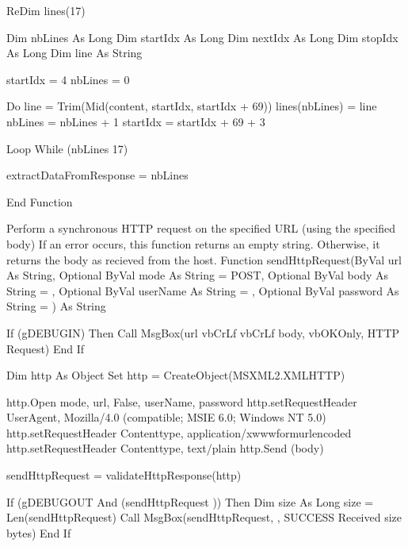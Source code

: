 \documentclass[letterpaper,10pt,english]{sphinxmanual}
\begin{document}
\begin{sphinxVerbatim}[commandchars=\\\{\}]
   ReDim lines(17)

   Dim nbLines As Long
   Dim startIdx As Long
   Dim nextIdx As Long
   Dim stopIdx As Long
   Dim line As String

   startIdx = 4
   nbLines = 0

   Do
      line = Trim(Mid(content, startIdx, startIdx + 69))
      lines(nbLines) = line
      nbLines = nbLines + 1
      startIdx = startIdx + 69 + 3

   Loop While (nbLines \PYGZlt{} 17)

   extractDataFromResponse = nbLines

End Function


\PYGZsq{} Perform a synchronous HTTP request on the specified URL (using the specified body)
\PYGZsq{} If an error occurs, this function returns an empty string.
\PYGZsq{} Otherwise, it returns the body as recieved from the host.
\PYGZsq{}
Function sendHttpRequest(ByVal url As String, \PYGZus{}
                        Optional ByVal mode As String = \PYGZdq{}POST\PYGZdq{}, \PYGZus{}
                        Optional ByVal body As String = \PYGZdq{}\PYGZdq{}, \PYGZus{}
                        Optional ByVal userName As String = \PYGZdq{}\PYGZdq{}, \PYGZus{}
                        Optional ByVal password As String = \PYGZdq{}\PYGZdq{}) As String

   If (g\PYGZus{}DEBUG\PYGZus{}IN) Then
      Call MsgBox(url \PYGZam{} vbCrLf \PYGZam{} vbCrLf \PYGZam{} body, vbOKOnly, \PYGZdq{}HTTP Request\PYGZdq{})
   End If

   Dim http As Object
   Set http = CreateObject(\PYGZdq{}MSXML2.XMLHTTP\PYGZdq{})

   http.Open mode, url, False, userName, password
   http.setRequestHeader \PYGZdq{}User\PYGZhy{}Agent\PYGZdq{}, \PYGZdq{}Mozilla/4.0 (compatible; MSIE 6.0; Windows NT 5.0)\PYGZdq{}
\PYGZsq{}   http.setRequestHeader \PYGZdq{}Content\PYGZhy{}type\PYGZdq{}, \PYGZdq{}application/x\PYGZhy{}www\PYGZhy{}form\PYGZhy{}urlencoded\PYGZdq{}
   http.setRequestHeader \PYGZdq{}Content\PYGZhy{}type\PYGZdq{}, \PYGZdq{}text/plain\PYGZdq{}
   http.Send (body)

   sendHttpRequest = validateHttpResponse(http)

   If (g\PYGZus{}DEBUG\PYGZus{}OUT And (sendHttpRequest \PYGZlt{}\PYGZgt{} \PYGZdq{}\PYGZdq{})) Then
      Dim size As Long
      size = Len(sendHttpRequest)
      Call MsgBox(sendHttpRequest, , \PYGZdq{}SUCCESS \PYGZhy{} Received \PYGZdq{} \PYGZam{} size \PYGZam{} \PYGZdq{} bytes\PYGZdq{})
   End If


\end{sphinxVerbatim}
\end{document}
